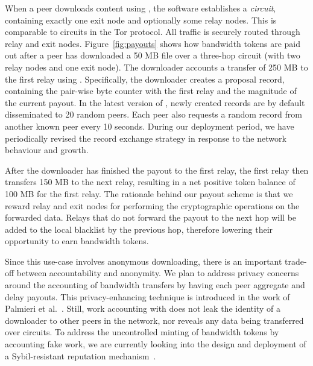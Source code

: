 When a peer downloads content using \Tribler{}, the \Tribler{} software establishes a \emph{circuit}, containing exactly one exit node and optionally some relay nodes.
This is comparable to circuits in the Tor protocol.
All traffic is securely routed through relay and exit nodes.
Figure~\ref{fig:payouts} shows how bandwidth tokens are paid out after a peer has downloaded a 50 MB file over a three-hop circuit (with two relay nodes and one exit node).
The downloader accounts a transfer of 250 MB to the first relay using \TrustChain{}.
Specifically, the downloader creates a proposal record, containing the pair-wise byte counter with the first relay and the magnitude of the current payout.
In the latest version of \Tribler{}, newly created records are by default disseminated to 20 random peers.
Each peer also requests a random record from another known peer every 10 seconds.
During our deployment period, we have periodically revised the record exchange strategy in response to the network behaviour and growth.

After the downloader has finished the payout to the first relay, the first relay then transfers 150 MB to the next relay, resulting in a net positive token balance of 100 MB for the first relay.
The rationale behind our payout scheme is that we reward relay and exit nodes for performing the cryptographic operations on the forwarded data.
Relays that do not forward the payout to the next hop will be added to the local blacklist by the previous hop, therefore lowering their opportunity to earn bandwidth tokens.

Since this use-case involves anonymous downloading, there is an important trade-off between accountability and anonymity.
We plan to address privacy concerns around the accounting of bandwidth transfers by having each peer aggregate and delay payouts.
This privacy-enhancing technique is introduced in the work of Palmieri et al.~\cite{palmieri2015paying}.
Still, work accounting with \TrustChain{} does not leak the identity of a downloader to other peers in the network, nor reveals any data being transferred over circuits.
To address the uncontrolled minting of bandwidth tokens by accounting fake work, we are currently looking into the design and deployment of a Sybil-resistant reputation mechanism~\cite{otte2017trustchain}.

